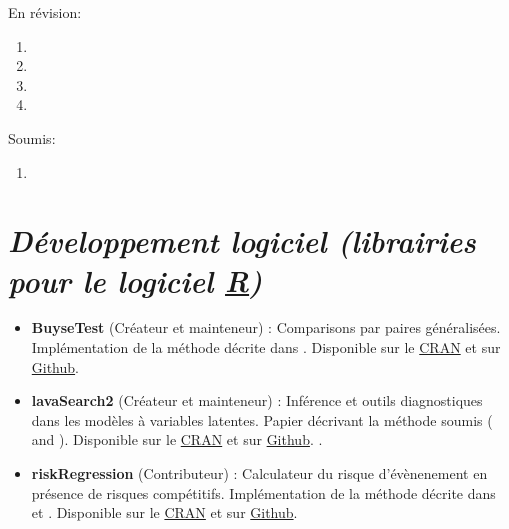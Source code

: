 \documentclass[12pt]{article}
\begin{document}
\pagebreak[3]

En révision:
 \begin{enumerate}
    \item {}
    \item {}
    \item {}
    \item {}
\end{enumerate}

\pagebreak[3]

Soumis:
\begin{enumerate}
   \item {}    
 \end{enumerate}

\pagebreak[3]

\section*{\emph{Développement logiciel (librairies pour le logiciel \href{https://www.r-project.org/}{R})}}
\label{sec:org5ebaef4}
\begin{minipage}{0.01\textwidth}
\hspace{\fill}
\end{minipage}
\begin{minipage}{0.92\textwidth}
\begin{itemize}
\item \textbf{BuyseTest} (Créateur et mainteneur) : Comparisons par paires
généralisées. Implémentation de la méthode décrite dans
\citep{peron2016extension,peron20XXunbiased}. Disponible sur le \href{https://cran.r-project.org/web/packages/BuyseTest/index.html}{CRAN}
et sur \href{https://github.com/bozenne/BuyseTest}{Github}.

\item \textbf{lavaSearch2} (Créateur et mainteneur) : Inférence et outils
diagnostiques dans les modèles à variables latentes. Papier
décrivant la méthode soumis (\citep{ozenne20XXsmall} and \citep{ozenne20XXcontroling}). Disponible sur le \href{https://cran.r-project.org/web/packages/lavaSearch2/index.html}{CRAN} et sur \href{https://github.com/bozenne/lavaSearch2}{Github}. .

\item \textbf{riskRegression} (Contributeur) : Calculateur du risque
d'évènenement en présence de risques compétitifs. Implémentation de
la méthode décrite dans \citep{ozenne2017riskregression} et
\citep{ozenne20XXestimation}. Disponible sur le \href{https://cran.r-project.org/web/packages/riskRegression/index.html}{CRAN} et sur \href{https://github.com/tagteam/riskRegression}{Github}.
\end{itemize}
\end{minipage}
\end{document}
